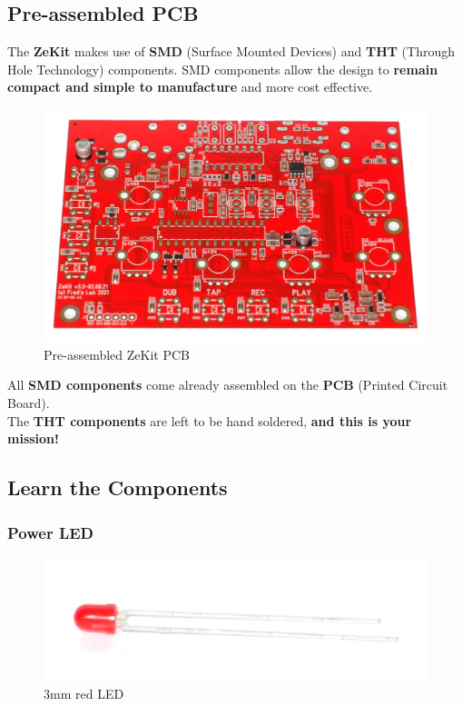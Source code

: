 \documentclass{scrartcl}
\begin{document}
\pagebreak
\subsection{Pre-assembled PCB}

The \textbf{ZeKit} makes use of \textbf{SMD} (Surface Mounted Devices) and \textbf{THT} (Through Hole Technology) components. SMD components allow the design to \textbf{remain compact and simple to manufacture} and more cost effective.

\begin{figure}[!ht]
    \begin{center}
        \includegraphics[scale=0.10]{assets/zekit-unassembled.jpg}
        \caption{Pre-assembled ZeKit PCB}
    \end{center}
\end{figure}

All \textbf{SMD components} come already assembled on the \textbf{PCB} (Printed Circuit Board). \\
The \textbf{THT components} are left to be hand soldered, \textbf{and this is your mission!}

\subsection{Learn the Components}

\subsubsection{Power LED}

\begin{figure}[!ht]
    \begin{center}
        \includegraphics[scale=0.15]{assets/zekit-led.jpg}
        \caption{3mm red LED}
    \end{center}
\end{figure}
\end{document}
